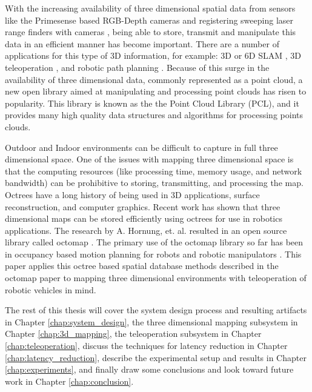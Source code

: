 \documentclass[12pt]{report}
\begin{document}
With the increasing availability of three dimensional spatial data from sensors like the Primesense based RGB-Depth cameras \cite{PRIMESENSE} and registering sweeping laser range finders with cameras \cite{photo_real}, being able to store, transmit and manipulate this data in an efficient manner has become important.  There are a number of applications for this type of 3D information, for example: 3D or 6D SLAM \cite{biswasdepth}, 3D teleoperation \cite{photo_real}, and robotic path planning \cite{3DCOLLISION}.  Because of this surge in the availability of three dimensional data, commonly represented as a point cloud, a new open library aimed at manipulating and processing point clouds has risen to popularity.  This library is known as the the Point Cloud Library (PCL)\cite{rusu20113d}, and it provides many high quality data structures and algorithms for processing points clouds.
  
Outdoor and Indoor environments can be difficult to capture in full three dimensional space. One of the issues with mapping three dimensional space is that the computing resources (like processing time, memory usage, and network bandwidth) can be prohibitive to storing, transmitting, and processing the map. Octrees have a long history of being used in 3D applications\cite{boada2001multiresolution}, surface reconstruction\cite{kazhdan2006poisson}, and computer graphics\cite{fang1996deformable}. Recent work has shown that three dimensional maps can be stored efficiently using octrees for use in robotics applications\cite{octomap}. The research by A. Hornung, et. al. resulted in an open source library called octomap \cite{octomap}. The primary use of the octomap library so far has been in occupancy based motion planning for robots and robotic manipulators \cite{3DCOLLISION}. This paper applies this octree based spatial database methods described in the octomap paper to mapping three dimensional environments with teleoperation of robotic vehicles in mind.


The rest of this thesis will cover the system design process and resulting artifacts in Chapter \ref{chap:system_design}, the three dimensional mapping subsystem in Chapter \ref{chap:3d_mapping}, the teleoperation subsystem in Chapter \ref{chap:teleoperation}, discuss the techniques for latency reduction in Chapter \ref{chap:latency_reduction}, describe the experimental setup and results in Chapter \ref{chap:experiments}, and finally draw some conclusions and look toward future work in Chapter \ref{chap:conclusion}.
\end{document}

